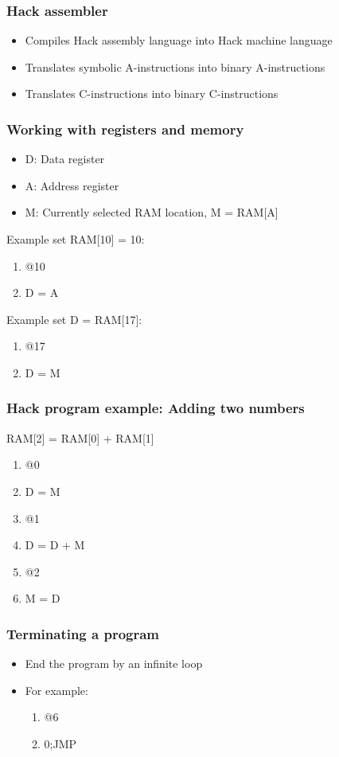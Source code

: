 \documentclass[12pt,a4paper]{article}
\begin{document}
\subsubsection{Hack assembler}
\begin{itemize}
    \item Compiles Hack assembly language into Hack machine language
    \item Translates symbolic A-instructions into binary A-instructions
    \item Translates C-instructions into binary C-instructions
\end{itemize}

\subsubsection{Working with registers and memory}
\begin{itemize}
    \item D: Data register 
    \item A: Address register
    \item M: Currently selected RAM location, M = RAM[A]
\end{itemize}

\noindent Example set RAM[10] = 10:
\begin{enumerate}
    \item @10
    \item D = A
\end{enumerate}
Example set D = RAM[17]:
\begin{enumerate}
    \item @17
    \item D = M
\end{enumerate}

\subsubsection{Hack program example: Adding two numbers}
RAM[2] = RAM[0] + RAM[1]
\begin{enumerate}
    \item @0
    \item D = M
    \item @1
    \item D = D + M
    \item @2
    \item M = D
\end{enumerate}

\subsubsection{Terminating a program}
\begin{itemize}
    \item End the program by an infinite loop
    \item For example:
    \begin{enumerate}
        \item @6
        \item 0;JMP 
    \end{enumerate}
\end{itemize}
\end{document}
